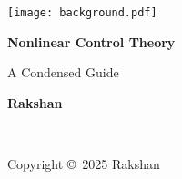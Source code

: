 \documentclass[
	11pt, %
	fleqn, %
	a4paper, %
]{LegrandOrangeBook}
\begin{document}

\titlepage %
	{\texttt{[image: background.pdf]}} %
	{ %
		\centering\sffamily %
		{\Huge\bfseries Nonlinear Control Theory\par} %
		\vspace{16pt} %
		{\LARGE A Condensed Guide\par} %
		\vspace{24pt} %
		{\huge\bfseries Rakshan\par} %
	}


\thispagestyle{empty} %

~\vfill %

\noindent Copyright \copyright\ 2025 Rakshan\\ %


\end{document}
